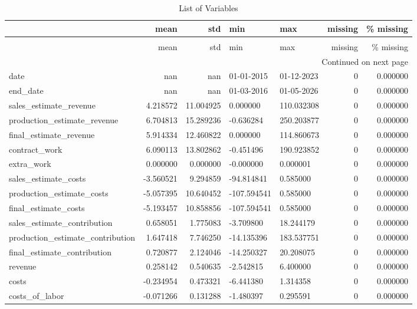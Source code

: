 \begin{landscape}\begin{longtable}[h!]{lrrllrr}
\caption{List of Variables} \label{eda_1} \\
\toprule
 & mean & std & min & max & missing & \% missing \\
\midrule
\endfirsthead
\caption[]{List of Variables} \\
\toprule
 & mean & std & min & max & missing & \% missing \\
\midrule
\endhead
\midrule
\multicolumn{7}{r}{Continued on next page} \\
\midrule
\endfoot
\bottomrule
\endlastfoot
date & nan & nan & 01-01-2015 & 01-12-2023 & 0 & 0.000000 \\
end_date & nan & nan & 01-03-2016 & 01-05-2026 & 0 & 0.000000 \\
sales_estimate_revenue & 4.218572 & 11.004925 & 0.000000 & 110.032308 & 0 & 0.000000 \\
production_estimate_revenue & 6.704813 & 15.289236 & -0.636284 & 250.203877 & 0 & 0.000000 \\
final_estimate_revenue & 5.914334 & 12.460822 & 0.000000 & 114.860673 & 0 & 0.000000 \\
contract_work & 6.090113 & 13.802862 & -0.451496 & 190.923852 & 0 & 0.000000 \\
extra_work & 0.000000 & 0.000000 & -0.000000 & 0.000001 & 0 & 0.000000 \\
sales_estimate_costs & -3.560521 & 9.294859 & -94.814841 & 0.585000 & 0 & 0.000000 \\
production_estimate_costs & -5.057395 & 10.640452 & -107.594541 & 0.585000 & 0 & 0.000000 \\
final_estimate_costs & -5.193457 & 10.858856 & -107.594541 & 0.585000 & 0 & 0.000000 \\
sales_estimate_contribution & 0.658051 & 1.775083 & -3.709800 & 18.244179 & 0 & 0.000000 \\
production_estimate_contribution & 1.647418 & 7.746250 & -14.135396 & 183.537751 & 0 & 0.000000 \\
final_estimate_contribution & 0.720877 & 2.124046 & -14.250327 & 20.208075 & 0 & 0.000000 \\
revenue & 0.258142 & 0.540635 & -2.542815 & 6.400000 & 0 & 0.000000 \\
costs & -0.234954 & 0.473321 & -6.441380 & 1.314358 & 0 & 0.000000 \\
costs_of_labor & -0.071266 & 0.131288 & -1.480397 & 0.295591 & 0 & 0.000000 \\

\end{longtable}
\end{landscape}
